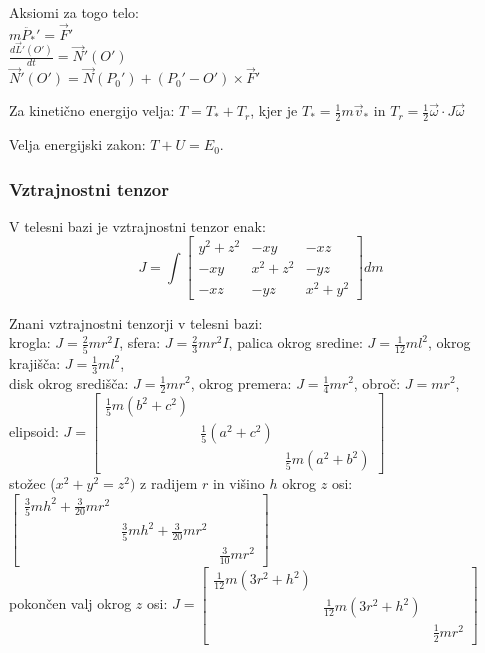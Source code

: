 \documentclass[a4paper,10pt]{article}
\theoremstyle{definition}
\newcommand{\vomega}{\vec{\omega}}
\newcommand{\Pt}{P_{\ast}}
\begin{document}
Aksiomi za togo telo: \\
$m\ddot{\Pt}' = \vec{F}'$ \\
$\displaystyle \frac{d\vec{L}'(O')}{dt} = \vec{N}'(O')$ \\
$\vec{N}'(O') = \vec{N}(P_0') + (P_0' - O') \times \vec{F}'$

Za kinetično energijo velja:
$T = T_\ast + T_r$, kjer je $T_\ast = \frac12 m\vec{v}_\ast$ in $T_r = \frac12 \vomega \cdot J \vomega$

Velja energijski zakon: $T + U = E_0$.

\subsubsection*{Vztrajnostni tenzor}
V telesni bazi je vztrajnostni tenzor enak:
\[ J = \int
  \begin{bmatrix}
    y^2 + z^2 & -xy & -xz \\
    -xy & x^2 + z^2 & -yz \\
    -xz & -yz & x^2 + y^2
\end{bmatrix} dm \]

Znani vztrajnostni tenzorji v telesni bazi: \\
krogla: $J = \frac25mr^2I$, sfera: $J = \frac23mr^2I$, palica okrog sredine:
$J = \frac{1}{12}ml^2$, okrog krajišča: $J = \frac{1}{3}ml^2$, \\disk okrog
središča: $J = \frac12mr^2$, okrog premera: $J = \frac14mr^2$, obroč: $J =
mr^2$, \\
elipsoid: $J =
  \begin{bmatrix}
    \frac15m(b^2+c^2) & & \\ & \frac15(a^2+c^2) & \\ & & \frac15m(a^2+b^2)
  \end{bmatrix}$ \\
stožec ($x^2 + y^2 = z^2)$ z radijem $r$ in višino $h$ okrog $z$ osi:
  $\begin{bmatrix}
    \frac35 mh^2+\frac{3}{20}mr^2 & & \\ & \frac35mh^2 + \frac{3}{20}mr^2 & \\
    & & \frac{3}{10}mr^2
  \end{bmatrix}$ \\
pokončen valj okrog $z$ osi:
  $J = \begin{bmatrix}
    \frac{1}{12}m(3r^2+h^2) & & \\ & \frac{1}{12}m(3r^2 + h^2) & \\ & &
    \frac12 mr^2
  \end{bmatrix}$
\end{document}
